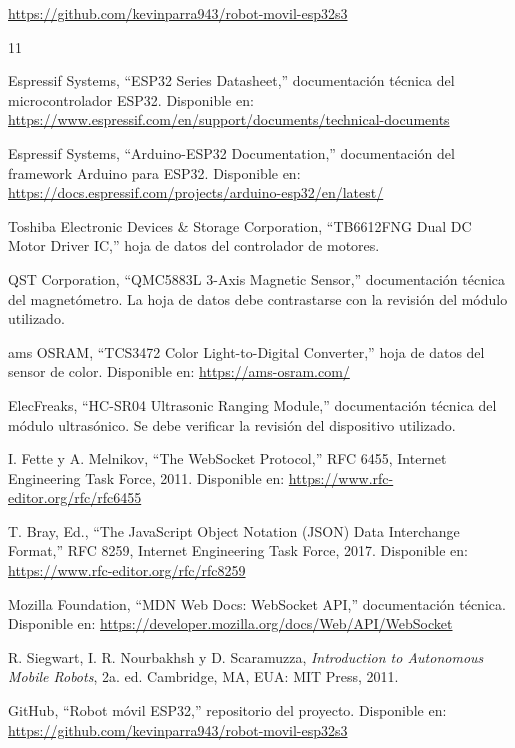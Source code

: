 \documentclass[journal]{IEEEtran}
\begin{document}
\begin{center}
\url{https://github.com/kevinparra943/robot-movil-esp32s3}
\end{center}


\ifCLASSOPTIONcaptionsoff
  \newpage
\fi

\begin{thebibliography}{11}

Espressif Systems, ``ESP32 Series Datasheet,'' documentación técnica del microcontrolador ESP32. Disponible en: \url{https://www.espressif.com/en/support/documents/technical-documents}

Espressif Systems, ``Arduino-ESP32 Documentation,'' documentación del framework Arduino para ESP32. Disponible en: \url{https://docs.espressif.com/projects/arduino-esp32/en/latest/}

Toshiba Electronic Devices \& Storage Corporation, ``TB6612FNG Dual DC Motor Driver IC,'' hoja de datos del controlador de motores.

QST Corporation, ``QMC5883L 3-Axis Magnetic Sensor,'' documentación técnica del magnetómetro. La hoja de datos debe contrastarse con la revisión del módulo utilizado.

ams OSRAM, ``TCS3472 Color Light-to-Digital Converter,'' hoja de datos del sensor de color. Disponible en: \url{https://ams-osram.com/}

ElecFreaks, ``HC-SR04 Ultrasonic Ranging Module,'' documentación técnica del módulo ultrasónico. Se debe verificar la revisión del dispositivo utilizado.

I. Fette y A. Melnikov, ``The WebSocket Protocol,'' RFC 6455, Internet Engineering Task Force, 2011. Disponible en: \url{https://www.rfc-editor.org/rfc/rfc6455}

T. Bray, Ed., ``The JavaScript Object Notation (JSON) Data Interchange Format,'' RFC 8259, Internet Engineering Task Force, 2017. Disponible en: \url{https://www.rfc-editor.org/rfc/rfc8259}

Mozilla Foundation, ``MDN Web Docs: WebSocket API,'' documentación técnica. Disponible en: \url{https://developer.mozilla.org/docs/Web/API/WebSocket}

R. Siegwart, I. R. Nourbakhsh y D. Scaramuzza, \emph{Introduction to Autonomous Mobile Robots}, 2a. ed. Cambridge, MA, EUA: MIT Press, 2011.

GitHub, ``Robot móvil ESP32,'' repositorio del proyecto. Disponible en: \url{https://github.com/kevinparra943/robot-movil-esp32s3}

\end{thebibliography}
\end{document}
